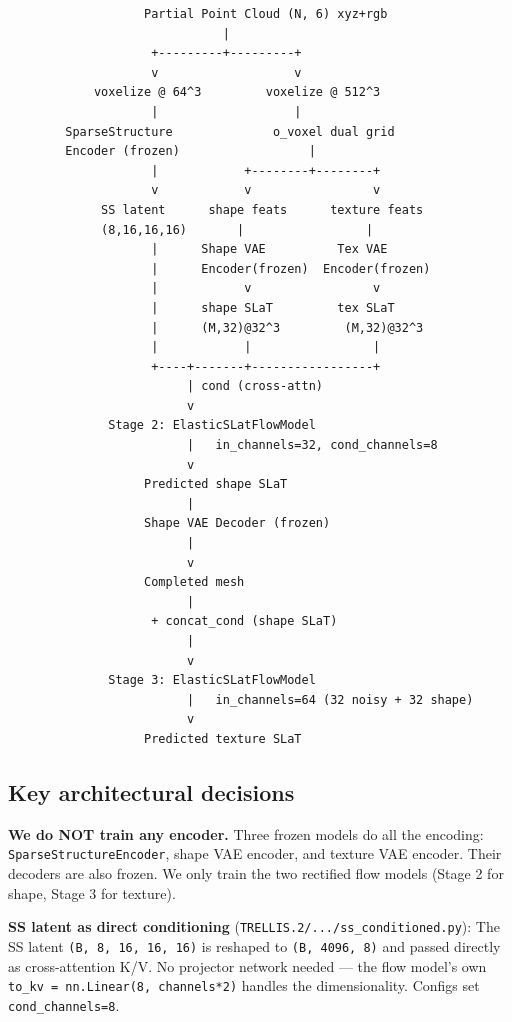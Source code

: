 \begin{lstlisting}
                   Partial Point Cloud (N, 6) xyz+rgb
                              |
                    +---------+---------+
                    v                   v
            voxelize @ 64^3         voxelize @ 512^3
                    |                   |
        SparseStructure              o_voxel dual grid
        Encoder (frozen)                  |
                    |            +--------+--------+
                    v            v                 v
             SS latent      shape feats      texture feats
             (8,16,16,16)       |                 |
                    |      Shape VAE          Tex VAE
                    |      Encoder(frozen)  Encoder(frozen)
                    |            v                 v
                    |      shape SLaT         tex SLaT
                    |      (M,32)@32^3         (M,32)@32^3
                    |            |                 |
                    +----+-------+-----------------+
                         | cond (cross-attn)
                         v
              Stage 2: ElasticSLatFlowModel
                         |   in_channels=32, cond_channels=8
                         v
                   Predicted shape SLaT
                         |
                   Shape VAE Decoder (frozen)
                         |
                         v
                   Completed mesh
                         |
                    + concat_cond (shape SLaT)
                         |
                         v
              Stage 3: ElasticSLatFlowModel
                         |   in_channels=64 (32 noisy + 32 shape)
                         v
                   Predicted texture SLaT
\end{lstlisting}

\subsection{Key architectural decisions}

\textbf{We do NOT train any encoder.} Three frozen models do all the encoding:
\texttt{SparseStructureEncoder}, shape VAE encoder, and texture VAE encoder.
Their decoders are also frozen. We only train the two rectified flow models
(Stage 2 for shape, Stage 3 for texture).

\textbf{SS latent as direct conditioning} (\texttt{TRELLIS.2/.../ss\_conditioned.py}):
The SS latent \texttt{(B, 8, 16, 16, 16)} is reshaped to \texttt{(B, 4096, 8)} and passed
directly as cross-attention K/V. No projector network needed --- the flow
model's own \texttt{to\_kv = nn.Linear(8, channels*2)} handles the dimensionality.
Configs set \texttt{cond\_channels=8}.

